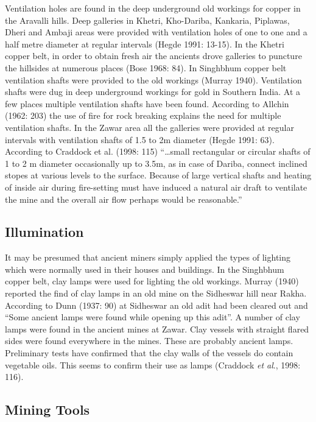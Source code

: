 Ventilation holes are found in the deep underground old workings for copper in the Aravalli hills. Deep galleries in Khetri, Kho-Dariba, Kankaria, Piplawas, Dheri and Ambaji areas were provided with ventilation holes of one to one and a half metre diameter at regular intervals (Hegde 1991: 13-15). In the Khetri copper belt, in order to obtain fresh air the ancients drove galleries to puncture the hillsides at numerous places (Bose 1968: 84). In Singhbhum copper belt ventilation shafts were provided to the old workings (Murray 1940). Ventilation shafts were dug in deep underground workings for gold in Southern India. At a few places multiple ventilation shafts have been found. According to Allchin (1962: 203) the use of fire for rock breaking explains the need for multiple ventilation shafts. In the Zawar area all the galleries were provided at regular intervals with ventilation shafts of 1.5 to 2m diameter (Hegde 1991: 63). According to Craddock et al. (1998: 115) “…small rectangular or circular shafts of 1 to 2 m diameter occasionally up to 3.5m, as in case of Dariba, connect inclined stopes at various levels to the surface. Because of large vertical shafts and heating of inside air during fire-setting must have induced a natural air draft to ventilate the mine and the overall air flow perhaps would be reasonable.”


\subsection*{Illumination}

It may be presumed that ancient miners simply applied the types of lighting which were normally used in their houses and buildings. In the Singhbhum copper belt, clay lamps were used for lighting the old workings. Murray (1940) reported the find of clay lamps in an old mine on the Sidheswar hill near Rakha. According to Dunn (1937: 90) at Sidheswar an old adit had been cleared out and “Some ancient lamps were found while opening up this adit”. A number of clay lamps were found in the ancient mines at Zawar. Clay vessels with straight flared sides were found everywhere in the mines. These are probably ancient lamps. Preliminary tests have confirmed that the clay walls of the vessels do contain vegetable oils. This seems to confirm their use as lamps (Craddock \textit{et al}., 1998: 116).


\subsection*{Mining Tools}

